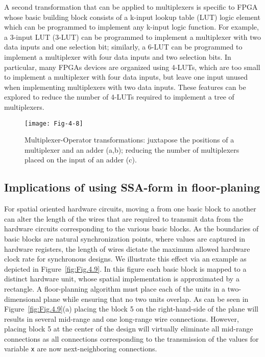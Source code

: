 A second transformation that can be applied to multiplexers is 
specific to FPGA whose basic building block consists of a k-input
lookup table (LUT) logic element which can be programmed to 
implement any k-input logic function.
For example, a 3-input LUT (3-LUT) can be programmed to
implement a multiplexer with two data inputs and one selection
bit; similarly, a 6-LUT can be programmed to implement a multiplexer
with four data inputs and two selection bits. 
In particular, many FPGAs devices are organized using 4-LUTs, 
which are too small to implement a multiplexer with four data inputs,
but leave one input unused when implementing multiplexers with
two data inputs. These features can be explored to reduce the number 
of 4-LUTs required to implement a tree of multiplexers.\\

\begin{figure}[thbp]
\centering
\texttt{[image: Fig-4-8]}
\caption{Multiplexer-Operator transformations: juxtapose the positions of
a multiplexer and an adder (a,b); reducing the number of multiplexers
placed on the input of an adder (c).}
\label{fig:Fig.4.8}
\end{figure}


\subsection{Implications of using SSA-form in floor-planing}

For spatial oriented hardware circuits, moving a \phifun
from one basic block to another can alter the length of the wires
that are required to transmit data from the hardware circuits
corresponding to the various basic blocks. 
As the boundaries of basic blocks are natural 
synchronization points, where values are captured in 
hardware registers, the length of wires dictate the maximum
allowed hardware clock rate for synchronous designs. 
We illustrate this effect via an example as depicted in 
Figure~\ref{fig:Fig.4.9}.
In this figure each basic block is mapped to a distinct hardware
unit, whose spatial implementation is approximated by a rectangle. 
A floor-planning algorithm must place each of the units in 
a two-dimensional plane while ensuring that no two units overlap. 
As can be seen in Figure~\ref{fig:Fig.4.9}(a) placing the block 5 on the 
right-hand-side of the plane will results in several mid-range 
and one long-range wire connections. However, placing block 5 
at the center of the design will virtually eliminate all 
mid-range connections as all connections corresponding to 
the transmission of the values for variable {\tt x} are now 
next-neighboring connections.\\

